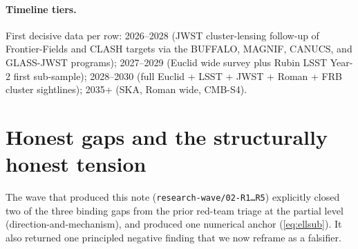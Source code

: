 \documentclass{pantarhei-researchnote}
\begin{document}
\paragraph{Timeline tiers.}
First decisive data per row: 2026--2028 (JWST cluster-lensing follow-up
of Frontier-Fields and CLASH targets via the BUFFALO, MAGNIF, CANUCS,
and GLASS-JWST programs); 2027--2029 (Euclid wide survey plus Rubin
LSST Year-2 first sub-sample); 2028--2030 (full Euclid + LSST + JWST +
Roman + FRB cluster sightlines); 2035+ (SKA, Roman wide,
CMB-S4).


\section{Honest gaps and the structurally honest tension}\label{sec:gaps}

The wave that produced this note (\texttt{research-wave/02-R1\ldots R5})
explicitly closed two of the three binding gaps from the
prior red-team triage at the partial level (direction-and-mechanism),
and produced one numerical anchor (\eqref{eq:ellsub}). It also returned
one principled negative finding that we now reframe as a falsifier.
\end{document}
